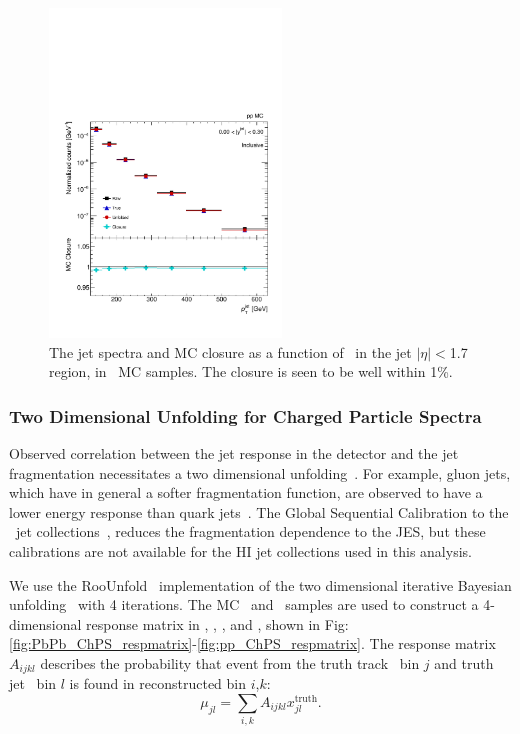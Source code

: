 \begin{figure}[ht]
\centering
\includegraphics[page=5, width=0.55\textwidth]{figures/main/corrections/spect_closure_pp_MC.pdf}
\caption{The jet spectra and MC closure as a function of \ptjet\ in the jet $|\eta| < $1.7 region, in \pp\ MC samples. The closure is seen to be well within 1\%.}
\label{fig:pp_jetspect_closure}
\end{figure}



\subsubsection{Two Dimensional Unfolding for Charged Particle Spectra}
\label{sec:2dunfolding}


Observed correlation between the jet response in the detector and the jet fragmentation necessitates a two dimensional unfolding~\cite{PhysRevC.98.024908}. 
For example, gluon jets, which have in general a softer fragmentation function, are observed to have a lower energy response than quark jets~\cite{Aad:2014bia}.  The Global Sequential Calibration to the \pp\ jet collections~\cite{ATLAS:2015oia}, reduces the fragmentation dependence to the JES, but these calibrations are not available for the HI jet collections used in this analysis.

We use the RooUnfold~\cite{Adye:2011gm} implementation of the two dimensional iterative Bayesian unfolding~\cite{D'Agostini:1994zf} with 4 iterations. The MC \pbpb\ and \pp\ samples are used to construct a 4-dimensional response matrix in \pttrktruth, \ptjettruth, \pttrkreco, and \ptjetreco, shown in Fig:\ref{fig:PbPb_ChPS_respmatrix}-\ref{fig:pp_ChPS_respmatrix}. The response matrix $A_{ijkl}$ describes the probability that event from the truth track \pt\  bin $j$ and truth jet \pT\ bin $l$ is found in reconstructed bin $i$,$k$:
\begin{equation}
\mu_{jl} = \sum_{i,k} A_{ijkl}x^{\text{truth}}_{jl}.
\end{equation} 


